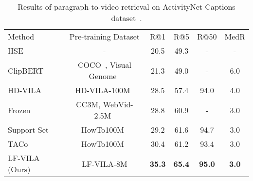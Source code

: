 \documentclass{article}
\begin{document}
\begin{table}[t]
    \small
    \centering
    \caption{Results of paragraph-to-video retrieval on ActivityNet Captions dataset~\cite{krishna2017actnetcaption}.}
    \begin{tabular}{l c c c c c} 
    \toprule
    Method &Pre-training Dataset & R@1  & R@5  & R@50  & MedR  \\
    \cmidrule{1-6}
    HSE~\cite{zhang2018hse} & - & 20.5 & 49.3 & - & -  \\
    ClipBERT~\cite{lei2021clipbert} & COCO~\cite{chen2015mscoco}, Visual Genome~\cite{krishna2017visualgenome} & 21.3 & 49.0& -& 6.0  \\
    HD-VILA~\cite{xue2021hdvila}  &HD-VILA-100M~\cite{xue2021hdvila}  & 28.5 & 57.4 & 94.0 & 4.0 \\
    Frozen~\cite{bain2021frozen} &CC3M, WebVid-2.5M~\cite{bain2021frozen} &28.8 &60.9 &- & 3.0 \\
    Support Set~\cite{patrick2020support}  &HowTo100M~\cite{miech2019howto100m} & 29.2 & 61.6 & 94.7 & 3.0 \\
    TACo~\cite{yang2021taco} &HowTo100M~\cite{miech2019howto100m} & 30.4  & 61.2 & 93.4 & 3.0 \\
    \cmidrule{1-6}
    LF-VILA (Ours)  &LF-VILA-8M & \textbf{35.3} & \textbf{65.4}&  \textbf{95.0} & \textbf{3.0} \\ 
    \bottomrule
    \end{tabular}
\label{tab:actnetret}
\end{table}
\end{document}
